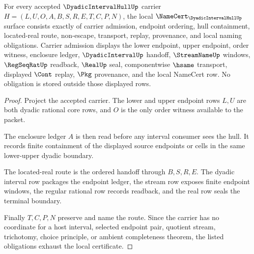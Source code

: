 \begin{theorem}
\label{thm:dyadic-interval-hull-namecert-obligations}
For every accepted $\DyadicIntervalHullUp$ carrier $H=(L,U,O,A,B,S,R,E,T,C,P,N)$, the local $\NameCert_{\DyadicIntervalHullUp}$ surface consists exactly of carrier admission, endpoint ordering, hull containment, located-real route, non-escape, transport, replay, provenance, and local naming obligations. Carrier admission displays the lower endpoint, upper endpoint, order witness, enclosure ledger, $\DyadicIntervalUp$ handoff, $\StreamNameUp$ windows, $\RegSeqRatUp$ readback, $\RealUp$ seal, componentwise $\hsame$ transport, displayed $\Cont$ replay, $\Pkg$ provenance, and the local NameCert row. No obligation is stored outside those displayed rows.
\end{theorem}
\begin{proof}
Project the accepted carrier. The lower and upper endpoint rows $L,U$ are both dyadic rational core rows, and $O$ is the only order witness available to the packet.

The enclosure ledger $A$ is then read before any interval consumer sees the hull. It records finite containment of the displayed source endpoints or cells in the same lower-upper dyadic boundary.

The located-real route is the ordered handoff through $B,S,R,E$. The dyadic interval row packages the endpoint ledger, the stream row exposes finite endpoint windows, the regular rational row records readback, and the real row seals the terminal boundary.

Finally $T,C,P,N$ preserve and name the route. Since the carrier has no coordinate for a host interval, selected endpoint pair, quotient stream, trichotomy, choice principle, or ambient completeness theorem, the listed obligations exhaust the local certificate.
\end{proof}

